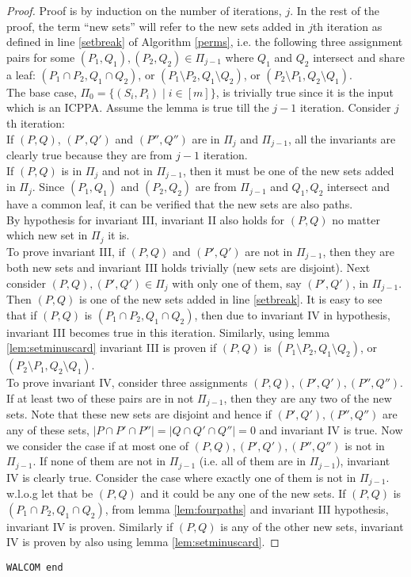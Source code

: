\begin{proof}
  Proof is by induction on the number of iterations, $j$. In the rest
  of the proof, the term ``new sets'' will refer to the new sets added
  in $j$th iteration as defined in line \ref{setbreak} of Algorithm
  \ref{perms}, i.e. the following three assignment pairs for some
  $(P_1,Q_1), (P_2,Q_2) \in \Pi_{j-1}$ where $Q_1$ and $Q_2$ intersect
  and share a leaf: $(P_1 \cap P_2, Q_1 \cap Q_2)$, or $(P_1 \setminus
  P_2, Q_1 \setminus Q_2)$, or $(P_2 \setminus P_1, Q_2
  \setminus Q_1)$.\\
  \noindent
  The base case, $\Pi_0 = \{(S_i,P_i) \mid i \in [m]\}$, is trivially
  true since it is the input which is an ICPPA.  Assume the lemma is
  true till the $j-1$ iteration. Consider $j$th
  iteration:\\
  \noindent
  If $(P,Q)$, $(P',Q')$ and $(P'',Q'')$ are in $\Pi_{j}$ and
  $\Pi_{j-1}$, all the invariants are
  clearly true because they are from $j-1$ iteration.\\
  If $(P,Q)$ is in $\Pi_{j}$ and not in $\Pi_{j-1}$, then it must be
  one of the new sets added in $\Pi_j$. Since $(P_1,Q_1)$ and
  $(P_2,Q_2)$ are from $\Pi_{j-1}$ and $Q_1,Q_2$ intersect and have a
  common leaf, it can be verified that the
  new sets are also paths. \\
  By hypothesis for invariant III, invariant II also holds for $(P,Q)$
  no matter which new set in $\Pi_j$ it
  is.\\
  To prove invariant III, if $(P,Q)$ and $(P',Q')$ are not in
  $\Pi_{j-1}$, then they are both new sets and invariant III holds
  trivially (new sets are disjoint). Next consider $(P,Q), (P',Q') \in
  \Pi_j$ with only one of them, say $(P',Q')$, in $\Pi_{j-1}$. Then
  $(P,Q)$ is one of the new sets added in line \ref{setbreak}. It is
  easy to see that if $(P,Q)$ is $(P_1 \cap P_2, Q_1 \cap Q_2)$, then
  due to invariant IV in hypothesis, invariant III becomes true in
  this iteration. Similarly, using lemma \ref{lem:setminuscard}
  invariant III is proven if $(P, Q)$ is $(P_1 \setminus P_2, Q_1
  \setminus Q_2)$, or $(P_2 \setminus P_1, Q_2
  \setminus Q_1)$.\\
  To prove invariant IV, consider three assignments
  $(P,Q),(P',Q'),(P'',Q'')$. If at least two of these pairs are in not
  $\Pi_{j-1}$, then they are any two of the new sets. Note that these
  new sets are disjoint and hence if $(P',Q'), (P'',Q'')$ are any of
  these sets, $|P \cap P' \cap P''|=|Q \cap Q' \cap Q''|=0$ and
  invariant IV is true. Now we consider the case if at most one of
  $(P,Q),(P',Q'),(P'',Q'')$ is not in $\Pi_{j-1}$. If none of them are
  not in $\Pi_{j-1}$ (i.e. all of them are in $\Pi_{j-1}$), invariant
  IV is clearly true. Consider the case where exactly one of them is
  not in $\Pi_{j-1}$. w.l.o.g let that be $(P,Q)$ and it could be any
  one of the new sets. If $(P,Q)$ is $(P_1 \cap P_2, Q_1 \cap Q_2)$,
  from lemma \ref{lem:fourpaths} and invariant III hypothesis,
  invariant IV is proven. Similarly if $(P,Q)$ is any of the other new
  sets, invariant IV is proven by also using lemma
  \ref{lem:setminuscard}. %

\end{proof} {\tt WALCOM end}

